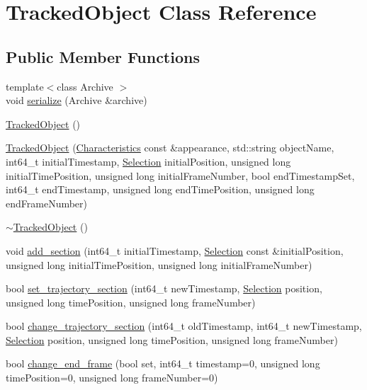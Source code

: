 \hypertarget{classTrackedObject}{}\section{Tracked\+Object Class Reference}
\label{classTrackedObject}
\subsection*{Public Member Functions}
\begin{DoxyCompactItemize}
\item 
{\footnotesize template$<$class Archive $>$ }\\void \hyperlink{classTrackedObject_ad6686a8c268d09f3c011d8fb33511550}{serialize} (Archive \&archive)
\item 
\hyperlink{classTrackedObject_ae5a9674bcce5464701811b6cd139dfaf}{Tracked\+Object} ()
\item 
\hyperlink{classTrackedObject_a30bc37fb38fd057d021c3dbe3f73b58e}{Tracked\+Object} (\hyperlink{structCharacteristics}{Characteristics} const \&appearance, std\+::string object\+Name, int64\+\_\+t initial\+Timestamp, \hyperlink{structSelection}{Selection} initial\+Position, unsigned long initial\+Time\+Position, unsigned long initial\+Frame\+Number, bool end\+Timestamp\+Set, int64\+\_\+t end\+Timestamp, unsigned long end\+Time\+Position, unsigned long end\+Frame\+Number)
\item 
\hyperlink{classTrackedObject_a3f9317e1ad294d3a391dfec7f7f926c0}{$\sim$\+Tracked\+Object} ()
\item 
void \hyperlink{classTrackedObject_a4cc6a3528caa148af9ab533a2bba587a}{add\+\_\+section} (int64\+\_\+t initial\+Timestamp, \hyperlink{structSelection}{Selection} const \&initial\+Position, unsigned long initial\+Time\+Position, unsigned long initial\+Frame\+Number)
\item 
bool \hyperlink{classTrackedObject_a89b293eacf57450551ecd30e768586be}{set\+\_\+trajectory\+\_\+section} (int64\+\_\+t new\+Timestamp, \hyperlink{structSelection}{Selection} position, unsigned long time\+Position, unsigned long frame\+Number)
\item 
bool \hyperlink{classTrackedObject_a0e8fd437e3e5af6d61d4cf3001463fa9}{change\+\_\+trajectory\+\_\+section} (int64\+\_\+t old\+Timestamp, int64\+\_\+t new\+Timestamp, \hyperlink{structSelection}{Selection} position, unsigned long time\+Position, unsigned long frame\+Number)
\item 
bool \hyperlink{classTrackedObject_a182387420b031f8c0c8a6dd102ebd10a}{change\+\_\+end\+\_\+frame} (bool set, int64\+\_\+t timestamp=0, unsigned long time\+Position=0, unsigned long frame\+Number=0)

\end{DoxyCompactItemize}
